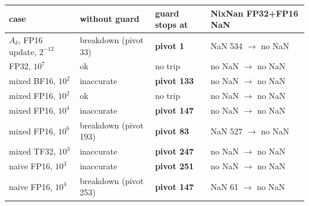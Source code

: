 \begin{tabular}{llll}
\toprule
case & without guard & guard stops at & NixNan FP32+FP16 NaN\\
\midrule
$A_\delta$, FP16 update, $2^{-12}$ & breakdown (pivot 33) & \textbf{pivot 1} & NaN 534 $\to$ no NaN\\
FP32, $10^{7}$ & ok & no trip & no NaN $\to$ no NaN\\
mixed BF16, $10^{2}$ & inaccurate & \textbf{pivot 133} & no NaN $\to$ no NaN\\
mixed FP16, $10^{2}$ & ok & no trip & no NaN $\to$ no NaN\\
mixed FP16, $10^{4}$ & inaccurate & \textbf{pivot 147} & no NaN $\to$ no NaN\\
mixed FP16, $10^{6}$ & breakdown (pivot 193) & \textbf{pivot 83} & NaN 527 $\to$ no NaN\\
mixed TF32, $10^{3}$ & inaccurate & \textbf{pivot 247} & no NaN $\to$ no NaN\\
naive FP16, $10^{3}$ & inaccurate & \textbf{pivot 251} & no NaN $\to$ no NaN\\
naive FP16, $10^{4}$ & breakdown (pivot 253) & \textbf{pivot 147} & NaN 61 $\to$ no NaN\\
\bottomrule
\end{tabular}

